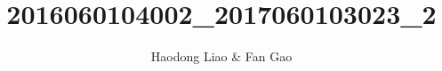 \documentclass{article}
\title{2016060104002\_2017060103023\_2}
\author{Haodong Liao \& Fan Gao}
\begin{document}
\maketitle{}











\end{document}
